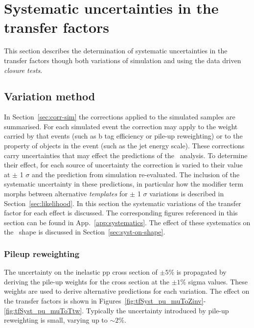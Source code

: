 \section{Systematic uncertainties in the transfer factors}
\label{sec:syst-uncs}
This section describes the determination of systematic uncertainties 
in the transfer factors though both variations of simulation
and using the data driven \emph{closure tests}. 

\subsection{Variation method}
\label{sec:syst-uncs-var}
In Section~\ref{sec:corr-sim} the corrections applied to the simulated samples are summarised. For each 
simulated event the correction may apply to the weight carried by that events (such as b tag efficiency
or pile-up reweighting) or to the property of objects in the event (such as the jet energy scale). 
These corrections carry uncertainties that may effect the predictions of the \alphat~analysis.
To determine their effect, for each source of uncertainty the correction is varied to their
value at $\pm$ 1 $\sigma$ and the prediction from simulation re-evaluated. The inclusion of the systematic uncertainty 
in these predictions, in particular how the modifier term morphs between alternative \emph{templates} 
for $\pm$ 1 $\sigma$ variations is described in Section~\ref{sec:likelihood}. In this section the systematic variations
of the transfer factor for each effect is discussed. The corresponding figures referenced in
this section can be found in App.~\ref{app:systematics}. The effect of these systematics on 
the \mht~shape is discussed in Section~\ref{sec:syst-on-shape}.

\subsubsection{Pileup reweighting}

The uncertainty on the inelastic pp cross section of $\pm5\%$ is propagated by deriving the pile-up
weights for the cross section at the $\pm1\%$ sigma values. These weights are used to derive
alternative predictions for each variation. The effect on the transfer factors is shown in 
Figures~\ref{fig:tfSyst_pu_muToZinv}-\ref{fig:tfSyst_pu_muToTtw}. Typically the uncertainty 
introduced by pile-up reweighting is small, varying up to $\sim2\%$.

